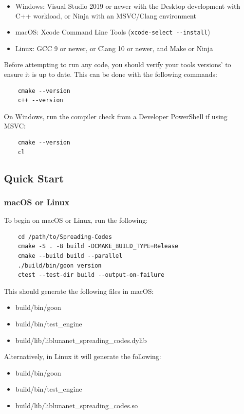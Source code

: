\documentclass{article}
\begin{document}
\begin{itemize}
    \item Windows: Visual Studio 2019 or newer with the Desktop development with C++ workload, or Ninja with an MSVC/Clang environment
    \item macOS: Xcode Command Line Tools (\verb|xcode-select --install|)
    \item Linux: GCC 9 or newer, or Clang 10 or newer, and Make or Ninja
\end{itemize}
Before attempting to run any code, you should verify your tools versions' to ensure it is up to date. This can be done with the following commands: 
\begin{verbatim}
    cmake --version
    c++ --version
\end{verbatim}
On Windows, run the compiler check from a Developer PowerShell if using MSVC: 
\begin{verbatim}
    cmake --version
    cl
\end{verbatim}

\subsection*{Quick Start}


\subsubsection*{macOS or Linux}

To begin on macOS or Linux, run the following: 
\begin{verbatim}
    cd /path/to/Spreading-Codes
    cmake -S . -B build -DCMAKE_BUILD_TYPE=Release
    cmake --build build --parallel
    ./build/bin/goon version
    ctest --test-dir build --output-on-failure
\end{verbatim}
This should generate the following files in macOS: 
\begin{itemize}
    \item build/bin/goon
    \item build/bin/test\_engine
    \item build/lib/liblunanet\_spreading\_codes.dylib
\end{itemize}
Alternatively, in Linux it will generate the following:
\begin{itemize}
    \item build/bin/goon
    \item build/bin/test\_engine
    \item build/lib/liblunanet\_spreading\_codes.so
\end{itemize}
\end{document}
